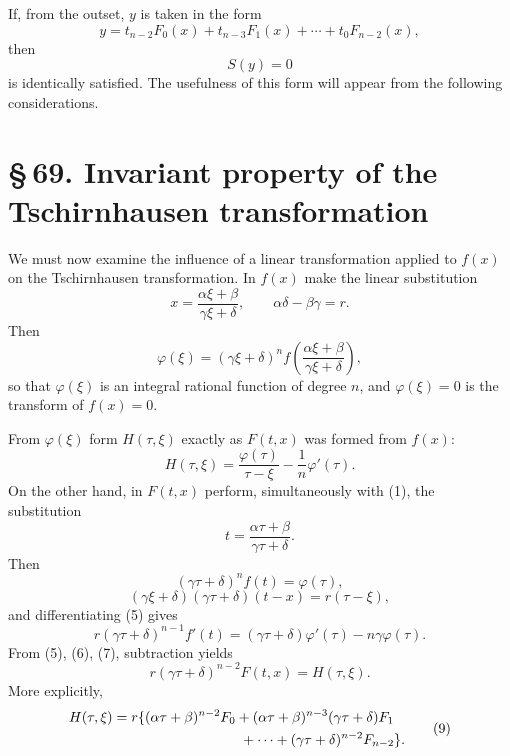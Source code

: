 \documentclass[11pt]{article}
\providecommand{\sect}[2]{\section*{\S\,#1. #2}}
\begin{document}
If, from the outset, $y$ is taken in the form
\begin{equation}
 y=t_{n-2}F_0(x)+t_{n-3}F_1(x)+\cdots+t_0F_{n-2}(x),
\tag{12}
\end{equation}
then
\begin{equation}
 S(y)=0
\tag{13}
\end{equation}
is identically satisfied. The usefulness of this form will appear from the following considerations.

\sect{69}{Invariant property of the Tschirnhausen transformation}

We must now examine the influence of a linear transformation applied to $f(x)$ on the Tschirnhausen transformation. In $f(x)$ make the linear substitution
\begin{equation}
 x=\frac{\alpha\xi+\beta}{\gamma\xi+\delta},
 \qquad
 \alpha\delta-\beta\gamma=r.
\tag{1}
\end{equation}
Then
\begin{equation}
 \varphi(\xi)=(\gamma\xi+\delta)^n f\!\left(\frac{\alpha\xi+\beta}{\gamma\xi+\delta}\right),
\tag{2}
\end{equation}
so that $\varphi(\xi)$ is an integral rational function of degree $n$, and $\varphi(\xi)=0$ is the transform of $f(x)=0$.

From $\varphi(\xi)$ form $H(\tau,\xi)$ exactly as $F(t,x)$ was formed from $f(x)$:
\begin{equation}
 H(\tau,\xi)=\frac{\varphi(\tau)}{\tau-\xi}-\frac1n\varphi'(\tau).
\tag{3}
\end{equation}
On the other hand, in $F(t,x)$ perform, simultaneously with (1), the substitution
\begin{equation}
 t=\frac{\alpha\tau+\beta}{\gamma\tau+\delta}.
\tag{4}
\end{equation}
Then
\begin{equation}
 (\gamma\tau+\delta)^nf(t)=\varphi(\tau),
\tag{5}
\end{equation}
\begin{equation}
 (\gamma\xi+\delta)(\gamma\tau+\delta)(t-x)=r(\tau-\xi),
\tag{6}
\end{equation}
and differentiating (5) gives
\begin{equation}
 r(\gamma\tau+\delta)^{n-1}f'(t)=(\gamma\tau+\delta)\varphi'(\tau)-n\gamma\varphi(\tau).
\tag{7}
\end{equation}
From (5), (6), (7), subtraction yields
\begin{equation}
 r(\gamma\tau+\delta)^{n-2}F(t,x)=H(\tau,\xi).
\tag{8}
\end{equation}
More explicitly,
\begin{equation}
\begin{aligned}
H(\tau,\xi)&=r\{(\alpha\tau+\beta)^{n-2}F_0+(\alpha\tau+\beta)^{n-3}(\gamma\tau+\delta)F_1\\
&\hspace{3.2cm}+\cdots+(\gamma\tau+\delta)^{n-2}F_{n-2}\}.
\end{aligned}
\tag{9}
\end{equation}
\end{document}
